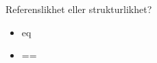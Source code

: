 

\ifkompendium\else

\begin{Slide}{Referenslikhet eller strukturlikhet?}
\begin{itemize}\SlideFontSmall
\item eq 
\item ==
\end{itemize}
\end{Slide}

\fi

